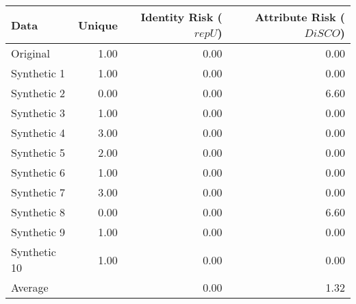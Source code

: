 \begin{tabular}{lrrr}
  \toprule
Data & Unique & Identity Risk ($repU$) & Attribute Risk ($DiSCO$) \\ 
  \midrule
Original & 1.00 & 0.00 & 0.00 \\ 
  Synthetic 1 & 1.00 & 0.00 & 0.00 \\ 
  Synthetic 2 & 0.00 & 0.00 & 6.60 \\ 
  Synthetic 3 & 1.00 & 0.00 & 0.00 \\ 
  Synthetic 4 & 3.00 & 0.00 & 0.00 \\ 
  Synthetic 5 & 2.00 & 0.00 & 0.00 \\ 
  Synthetic 6 & 1.00 & 0.00 & 0.00 \\ 
  Synthetic 7 & 3.00 & 0.00 & 0.00 \\ 
  Synthetic 8 & 0.00 & 0.00 & 6.60 \\ 
  Synthetic 9 & 1.00 & 0.00 & 0.00 \\ 
  Synthetic 10 & 1.00 & 0.00 & 0.00 \\ 
   \midrule 
Average &  & 0.00 & 1.32 \\ 
   \bottomrule
\end{tabular}
